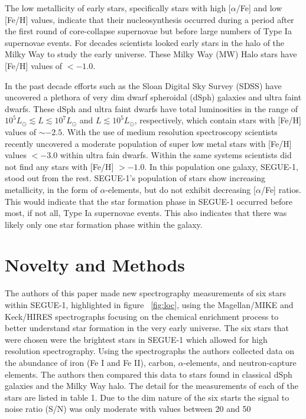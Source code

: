\documentclass{aastex631}
\begin{document}
The low metallicity of early stars, specifically stars with high [$\alpha$/Fe] and low [Fe/H] values, indicate that their
nucleosynthesis occurred during a period after the first round of core-collapse supernovae but before large numbers of
Type Ia supernovae events. For decades scientists looked early stars in the halo of the Milky Way to study the early universe.
These Milky Way (MW) Halo stars have [Fe/H] values of $< -1.0$.

In the past decade efforts such as the Sloan Digital Sky Survey (SDSS) have uncovered a plethora of very dim dwarf spheroidal
(dSph) galaxies and ultra faint dwarfs. These dSph and ultra faint dwarfs have total luminosities in the range of
\(10^{5} L_{\odot} \lesssim L \lesssim 10^{7} L_{\odot}\) and \(L \lesssim 10^5 L_{\odot}\), respectively, which contain
stars with [Fe/H] values of $\sim -2.5$. With the use of medium resolution spectroscopy scientists recently uncovered a
moderate population of super low metal stars with [Fe/H] values $< -3.0$ within ultra fain dwarfs. Within the same systems
scientists did not find any stars with [Fe/H] $> -1.0$. In this population one galaxy, SEGUE-1, stood out from the rest. 
SEGUE-1's population of stars show increasing metallicity, in the form of $\alpha$-elements, but do not exhibit decreasing
[$\alpha$/Fe] ratios. 
This would indicate that the star formation phase in SEGUE-1 occurred before most, if not all, Type Ia supernovae events. This
also indicates that there was likely only one star formation phase within the galaxy.
\section{Novelty and Methods} \label{sec:novelty}

The authors of this paper made new spectrography measurements of six stars within SEGUE-1, highlighted in figure ~\ref{fig:loc},
 using the Magellan/MIKE and Keck/HIRES
spectrographs focusing on the chemical enrichment process to better understand star formation in the very early universe. The six
stars that were chosen were the brightest stars in SEGUE-1 which allowed for high resolution spectrography. Using the spectrographs
the authors collected data on the abundance of iron (Fe I and Fe II), carbon, $\alpha$-elements, and neutron-capture elements.
The authors then compared this data to stars found in classical dSph galaxies and the Milky Way halo.
The detail for the measurements of each of the stars are listed in table 1. Due to the dim nature of the six starts the signal to
noise ratio (S/N) was only moderate with values between 20 and 50
\end{document}
